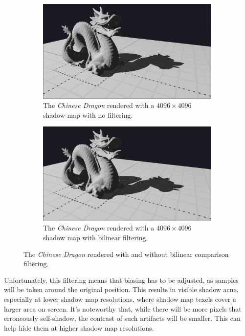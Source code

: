 \begin{figure}[h]
    \begin{subfigure}[t]{0.48\textwidth}
		\centering
        \includegraphics[width=\textwidth]{./graf/tests/basic/cropped/dragon_basic_fhd_4096.png}
        \caption{The \textit{Chinese Dragon} rendered with a \(4096\times 4096\) shadow map with no filtering.}
    \end{subfigure}
	\hfill
    \begin{subfigure}[t]{0.48\textwidth}
		\centering
        \includegraphics[width=\textwidth]{./graf/tests/bilinear/cropped/dragon_bilinear_fhd_4096.png}
        \caption{The \textit{Chinese Dragon} rendered with a \(4096\times 4096\) shadow map with bilinear filtering.}
    \end{subfigure}

    \caption{The \textit{Chinese Dragon} rendered with and without bilinear comparison filtering.}
    \label{fig:test_bilinear_dragon_screens}
\end{figure}

Unfortunately, this filtering means that biasing has to be adjusted, as samples will be taken around the original position. This results in visible shadow acne, especially at lower shadow map resolutions, where shadow map texels cover a larger area on screen. It's noteworthy that, while there will be more pixels that erroneously self-shadow, the contrast of such artifacts will be smaller. This can help hide them at higher shadow map resolutions.

